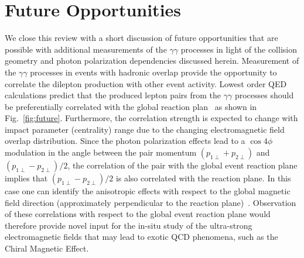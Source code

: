 \documentclass[12pt,epjc3]{svjour3}\sloppy
\begin{document}
\section{Future Opportunities}
\label{sec:future}
We close this review with a short discussion of future opportunities that are possible with additional measurements of the $\gamma\gamma$ processes in light of the collision geometry and photon polarization dependencies discussed herein. Measurement of the $\gamma\gamma$ processes in events with hadronic overlap provide the opportunity to correlate the dilepton production with other event activity. Lowest order QED calculations predict that the produced lepton pairs from the $\gamma\gamma$ processes should be preferentially correlated with the global reaction plan~\cite{zhaInitialTransversemomentumBroadening2020b} as shown in Fig.~\ref{fig:future}. Furthermore, the correlation strength is expected to change with impact parameter (centrality) range due to the changing electromagnetic field overlap distribution. 
Since the photon polarization effects lead to a $\cos4\phi$ modulation in the angle between the pair momentum $(p_{1\perp} + p_{2\perp})$ and $(p_{1\perp} - p_{2\perp})/2$, the correlation of the pair with the global event reaction plane implies that $(p_{1\perp} - p_{2\perp})/2$ is also correlated with the reaction plane. 
In this case one can identify the anisotropic effects with respect to the global magnetic field direction (approximately perpendicular to the reaction plane)~\cite{skokovEstimateMagneticField2009}.
Observation of these correlations with respect to the global event reaction plane would therefore provide novel input for the in-situ study of the ultra-strong electromagnetic fields that may lead to exotic QCD phenomena, such as the Chiral Magnetic Effect. 
\end{document}

